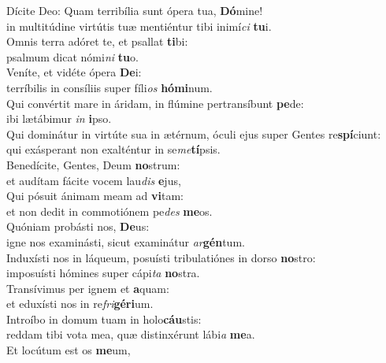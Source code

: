 \evenverse Dícite Deo: Quam terribília sunt ópera tua, \textbf{Dó}mine!~\*\\
\evenverse in multitúdine virtútis tuæ mentiéntur tibi inimí\textit{ci} \textbf{tu}i.\\
\oddverse Omnis terra adóret te, et psallat \textbf{ti}bi:~\*\\
\oddverse psalmum dicat nómi\textit{ni} \textbf{tu}o.\\
\evenverse Veníte, et vidéte ópera \textbf{De}i:~\*\\
\evenverse terríbilis in consíliis super fíli\textit{os} \textbf{hó}\textbf{mi}num.\\
\oddverse Qui convértit mare in áridam, in flúmine pertransíbunt \textbf{pe}de:~\*\\
\oddverse ibi lætábimur \textit{in} \textbf{i}pso.\\
\evenverse Qui dominátur in virtúte sua in ætérnum, óculi ejus super Gentes re\textbf{spí}ciunt:~\*\\
\evenverse qui exásperant non exalténtur in se\textit{me}\textbf{tí}psis.\\
\oddverse Benedícite, Gentes, Deum \textbf{no}strum:~\*\\
\oddverse et audítam fácite vocem lau\textit{dis} \textbf{e}jus,\\
\evenverse Qui pósuit ánimam meam ad \textbf{vi}tam:~\*\\
\evenverse et non dedit in commotiónem pe\textit{des} \textbf{me}os.\\
\oddverse Quóniam probásti nos, \textbf{De}us:~\*\\
\oddverse igne nos examinásti, sicut examinátur \textit{ar}\textbf{gén}tum.\\
\evenverse Induxísti nos in láqueum, posuísti tribulatiónes in dorso \textbf{no}stro:~\*\\
\evenverse imposuísti hómines super cápi\textit{ta} \textbf{no}stra.\\
\oddverse Transívimus per ignem et \textbf{a}quam:~\*\\
\oddverse et eduxísti nos in re\textit{fri}\textbf{gé}\textbf{ri}um.\\
\evenverse Introíbo in domum tuam in holo\textbf{cáu}stis:~\*\\
\evenverse reddam tibi vota mea, quæ distinxérunt lábi\textit{a} \textbf{me}a.\\
\oddverse Et locútum est os \textbf{me}um,~\*\\
